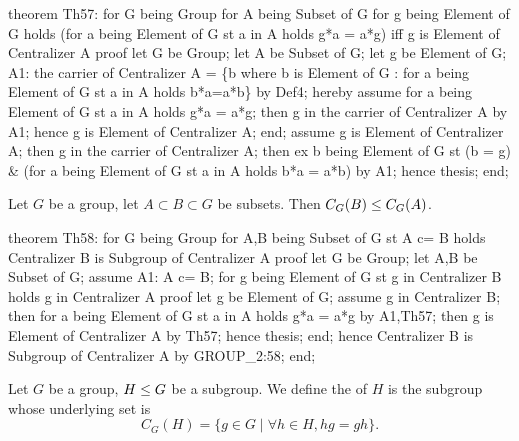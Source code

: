 \nwenddocs{}\endmoddef\nwstartdeflinemarkup{}\nwenddeflinemarkup
theorem Th57:
  for G being Group
  for A being Subset of G
  for g being Element of G
  holds (for a being Element of G st a in A holds g*a = a*g) iff
        g is Element of Centralizer A
proof
  let G be Group;
  let A be Subset of G;
  let g be Element of G;
A1: the carrier of Centralizer A = \{b where b is Element of G : for a
  being Element of G st a in A holds b*a=a*b\} by Def4;
  hereby
    assume for a being Element of G st a in A holds g*a = a*g;
    then g in the carrier of Centralizer A by A1;
    hence g is Element of Centralizer A;
  end;
  assume g is Element of Centralizer A;
  then g in the carrier of Centralizer A;
  then ex b being Element of G st (b = g) & (for a being Element of G st a in A
  holds b*a = a*b) by A1;
  hence thesis;
end;
\eatline
{}\nwendcode{}\nwdocspar

\begin{theorem}
  Let $G$ be a group, let $A\subset B\subset G$ be subsets.
  Then $C_{G}(B)\leq C_{G}(A)$.
\end{theorem}

\nwenddocs{}\endmoddef\nwstartdeflinemarkup{}\nwenddeflinemarkup
theorem Th58:
  for G being Group
  for A,B being Subset of G
  st A c= B
  holds Centralizer B is Subgroup of Centralizer A
proof
  let G be Group;
  let A,B be Subset of G;
  assume A1: A c= B;
  for g being Element of G st g in Centralizer B
  holds g in Centralizer A
  proof
    let g be Element of G;
    assume g in Centralizer B;
    then for a being Element of G st a in A
    holds g*a = a*g by A1,Th57;
    then g is Element of Centralizer A by Th57;
    hence thesis;
  end;
  hence Centralizer B is Subgroup of Centralizer A by GROUP_2:58;
end;
\eatline
{}\nwendcode{}\nwdocspar
\begin{definition}
Let $G$ be a group, $H\leq G$ be a subgroup.
We define the  of $H$ is the subgroup whose
underlying set is
\begin{equation}
C_{G}(H) = \{g\in G\mid \forall h\in H, hg=gh\}.
\end{equation}
\end{definition}

